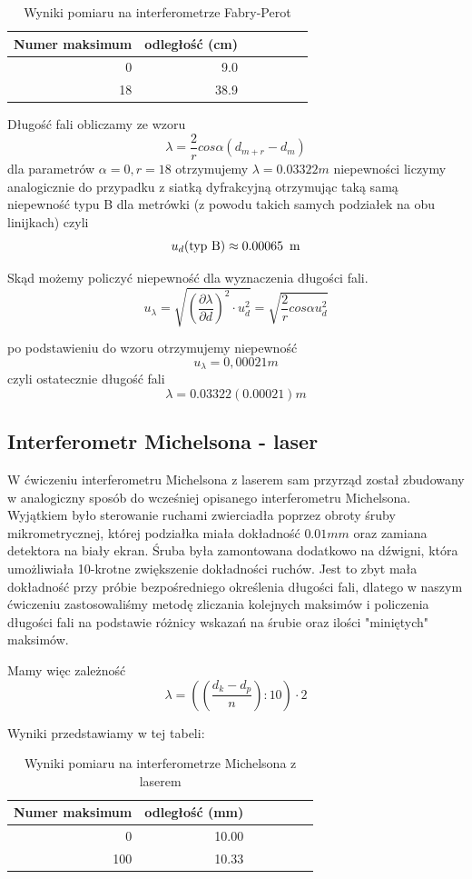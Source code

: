 \documentclass[a4paper]{article}
\newlength{\du}
\begin{document}
\begin{table}[h!]
\centering
\begin{tabular}{rrrrrrr}
\toprule
Numer maksimum & odległość (cm) \\
\midrule
0 & 9.0 \\
18 & 38.9 \\
\bottomrule
\end{tabular}
\caption{Wyniki pomiaru na interferometrze Fabry-Perot}
\label{pomiary_fabry_perot}
\end{table}

Długość fali obliczamy ze wzoru
$$\lambda = \frac{2}{r}cos \alpha (d_{m+r} - d_{m})$$
dla parametrów
$\alpha = 0, r = 18$
otrzymujemy $\lambda = 0.03322 m$
niepewności liczymy analogicznie do przypadku z siatką dyfrakcyjną otrzymując taką samą niepewność typu B dla metrówki (z powodu takich samych podziałek na obu linijkach) czyli
$$u_d (\text{typ B}) \approx 0.00065 \enskip \text{m}$$

Skąd możemy policzyć niepewność dla wyznaczenia długości fali. 
$$u_{\lambda} = \sqrt{(\frac{\partial \lambda}{\partial d})^2 \cdot u_d^2 } = \sqrt{\frac{2}{r}cos \alpha u_d^2}$$

po podstawieniu do wzoru otrzymujemy niepewność
$$u_{\lambda} = 0,00021 m$$
czyli ostatecznie długość fali $$\lambda = 0.03322(0.00021)m$$

\subsection{Interferometr Michelsona - laser}
W ćwiczeniu interferometru Michelsona z laserem sam przyrząd został zbudowany w analogiczny sposób
do wcześniej opisanego interferometru Michelsona.
Wyjątkiem było sterowanie ruchami zwierciadła poprzez obroty śruby mikrometrycznej, której podziałka
miała dokładność $0.01 mm$ oraz zamiana detektora na biały ekran.
Śruba była zamontowana dodatkowo na dźwigni, która umożliwiała 10-krotne zwiększenie dokładności ruchów.
Jest to zbyt mała dokładność przy próbie bezpośredniego określenia długości fali, dlatego w naszym ćwiczeniu
zastosowaliśmy metodę zliczania kolejnych maksimów
i policzenia długości fali na podstawie różnicy wskazań na śrubie oraz ilości "miniętych" maksimów.

Mamy więc zależność
$$\lambda = ((\frac{d_{k} - d_{p}}{n}):10) \cdot 2$$

Wyniki przedstawiamy w tej tabeli:


\begin{table}[h!]
\centering
\begin{tabular}{rrrrrrr}
\toprule
Numer maksimum & odległość (mm) \\
\midrule
0 & 10.00 \\
100 & 10.33 \\
\bottomrule
\end{tabular}
\caption{Wyniki pomiaru na interferometrze Michelsona z laserem}
\label{pomiary_michelsona_laser}
\end{table}
\end{document}
